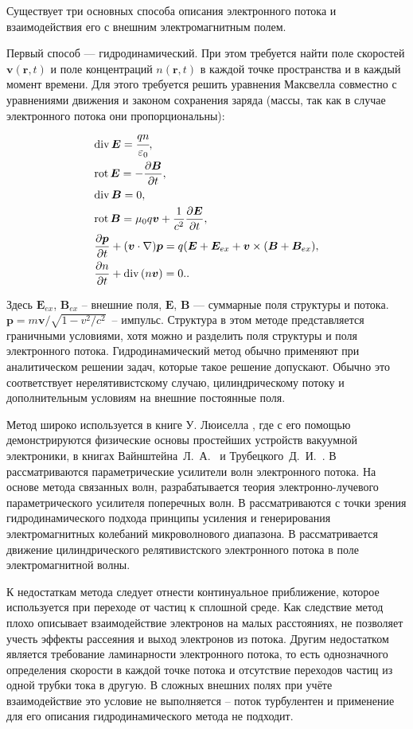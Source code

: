 \documentclass[a4paper,14pt]{extreport} %
\newcommand{\dff}[2]{\frac{\partial #1}{\partial #2}}
\renewcommand{\vec}[1]{\bm{#1}}
\renewcommand{\div}{\mathrm{div}\,}
\newcommand{\rot}{\mathrm{rot}\,}
\newcommand{\eps}{\varepsilon}
\begin{document}
Существует три основных способа описания электронного потока и взаимодействия его с внешним электромагнитным полем. 

Первый способ --- гидродинамический. При этом требуется найти поле скоростей $\vec{v}(\vec{r}, t)$ и поле концентраций $n(\vec{r}, t)$ в каждой точке пространства и в каждый момент времени. Для этого требуется решить уравнения Максвелла совместно с уравнениями движения и законом сохранения заряда (массы, так как в случае электронного потока они пропорциональны):
\begin{align}
& \div \vec{E} = \cfrac{qn}{\eps_0}, \label{eq1}\\
& \rot \vec{E} = - \dff{\vec{B}}{t}, \\
& \div \vec{B} = 0, \\
& \rot \vec{B} = \mu_0 q\vec{v} + \frac{1}{c^2}\dff{\vec{E}}{t}, \\
& \dff{\vec{p}}{t} + (\vec{v}\cdot\nabla) \vec{p} = q (\vec{E} + \vec{E}_{ex} + \vec{v} \times (\vec{B}  + \vec{B}_{ex}), \\
& \dff{n}{t} + \div (n \vec{v}) = 0. \label{eq1end}.
\end{align}

Здесь $\vec{E}_{ex}$, $\vec{B}_{ex}$ -- внешние поля, $\vec{E}$, $\vec{B}$ --- суммарные поля структуры и потока. $\vec{p} = m\vec{v} / \sqrt{1 - v^2/c^2}$~-- импульс. Структура в этом методе представляется граничными условиями, хотя можно и разделить поля структуры и поля электронного потока. Гидродинамический метод обычно применяют при аналитическом решении задач, которые такое решение допускают. Обычно это соответствует нерелятивистскому случаю, цилиндрическому потоку и дополнительным условиям на внешние постоянные поля.

Метод широко используется в книге У. Люиселла \cite{Louisell}, где с его помощью демонстрируются физические основы простейших устройств вакуумной электроники, в книгах Вайнштейна~Л.~А.~\cite{Vainshtain} и Трубецкого~Д.~И.~\cite{Chramov}. В \cite{UFNLopuchin} рассматриваются параметрические усилители волн электронного потока. На основе метода связанных волн, разрабатывается теория электронно-лучевого параметрического усилителя поперечных волн. В \cite{UFNVanke} рассматриваются с точки зрения гидродинамического подхода принципы усиления и генерирования электромагнитных колебаний микроволнового диапазона. В \cite{GTFKapch} рассматривается движение цилиндрического релятивистского электронного потока в поле электромагнитной волны.

К недостаткам метода следует отнести континуальное приближение, которое используется при переходе от частиц к сплошной среде. Как следствие метод плохо описывает взаимодействие электронов на малых расстояниях, не позволяет учесть эффекты рассеяния и выход электронов из потока. Другим недостатком является требование ламинарности электронного потока, то есть однозначного определения скорости в каждой точке потока и отсутствие переходов частиц из одной трубки тока в другую. В сложных внешних полях при учёте взаимодействие это условие не выполняется -- поток турбулентен и применение для его описания гидродинамического метода не подходит.
\end{document}
